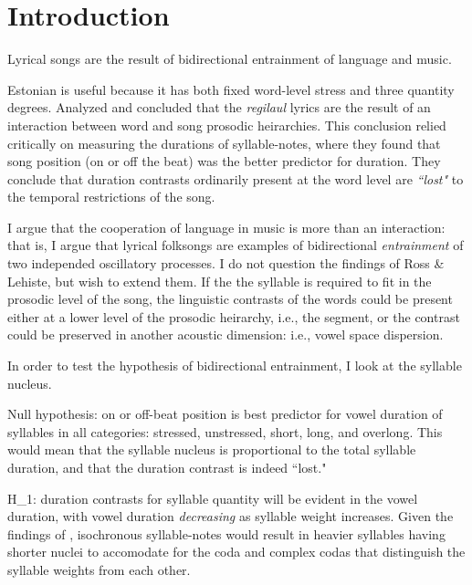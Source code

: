 \chapter{Introduction}

Lyrical songs are the result of bidirectional entrainment of language and music.

%



Estonian is useful because it has both fixed word-level stress and three quantity degrees. \cite{thatone} Analyzed and concluded that the {\it regilaul} lyrics are the result of an interaction between word and song prosodic heirarchies. This conclusion relied critically on measuring the durations of syllable-notes, where they found that song position (on or off the beat) was the better predictor for duration. They conclude that duration contrasts ordinarily present at the word level are {\it ``lost"} \cite{rosslostprosodic}   to the temporal restrictions of the song. 

I argue that the cooperation of language in music is more than an interaction: that is, I argue that lyrical folksongs are examples of bidirectional {\it entrainment} of two independed oscillatory processes. I do not question the findings of Ross \& Lehiste, but wish to extend them. If the the syllable is required to fit in the prosodic level of the song, the linguistic contrasts of the words could be present either at a lower level of the prosodic heirarchy, i.e.,  the segment, or the contrast could be preserved in another acoustic dimension: i.e.,  vowel space dispersion. 


In order to test the hypothesis of bidirectional entrainment, I look at the syllable nucleus. 

Null hypothesis: on or off-beat position is best predictor for vowel duration of syllables in all categories: stressed, unstressed, short, long, and overlong. This would mean that the syllable nucleus is proportional to the total syllable duration, and that the duration contrast is indeed ``lost." 

H_{1}: duration contrasts for syllable quantity will be evident in the vowel duration, with vowel duration {\it decreasing} as syllable weight increases. Given the findings of \cite{rosslehiste}, isochronous syllable-notes would result in heavier syllables having shorter nuclei to accomodate for the coda and complex codas that distinguish the syllable weights from each other. 

